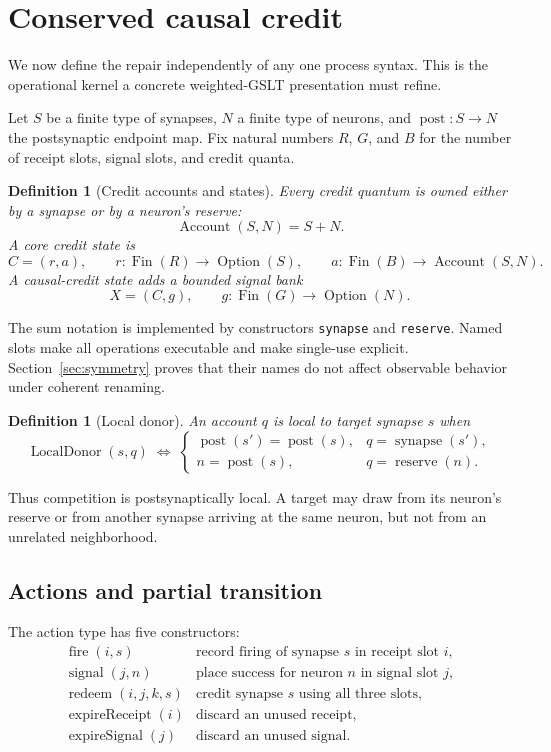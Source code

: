 \documentclass[11pt]{article}
\newtheorem{definition}[theorem]{Definition}
\newcommand{\GSLT}{\textup{GSLT}}
\newcommand{\Fin}{\operatorname{Fin}}
\newcommand{\Option}{\operatorname{Option}}
\newcommand{\post}{\operatorname{post}}
\newcommand{\reserve}{\operatorname{reserve}}
\newcommand{\synapse}{\operatorname{synapse}}
\newcommand{\Account}{\operatorname{Account}}
\newcommand{\code}[1]{\texttt{#1}}
\begin{document}
\section{Conserved causal credit}
\label{sec:semantics}

We now define the repair independently of any one process syntax.  This is the
operational kernel a concrete weighted-\GSLT{} presentation must refine.

Let $S$ be a finite type of synapses, $N$ a finite type of neurons, and
$\post:S\to N$ the postsynaptic endpoint map.  Fix natural numbers $R$, $G$,
and $B$ for the number of receipt slots, signal slots, and credit quanta.

\begin{definition}[Credit accounts and states]
Every credit quantum is owned either by a synapse or by a neuron's reserve:
\[
  \Account(S,N)=S+N.
\]
A core credit state is
\[
  C=(r,a),\qquad
  r:\Fin(R)\to\Option(S),\qquad
  a:\Fin(B)\to\Account(S,N).
\]
A causal-credit state adds a bounded signal bank
\[
  X=(C,g),\qquad g:\Fin(G)\to\Option(N).
\]
\end{definition}

The sum notation is implemented by constructors \code{synapse} and
\code{reserve}.  Named slots make all operations executable and make
single-use explicit.  Section~\ref{sec:symmetry} proves that their names do not
affect observable behavior under coherent renaming.

\begin{definition}[Local donor]
An account $q$ is local to target synapse $s$ when
\[
\operatorname{LocalDonor}(s,q)\;\Longleftrightarrow\;
\begin{cases}
  \post(s')=\post(s), & q=\synapse(s'),\\
  n=\post(s), & q=\reserve(n).
\end{cases}
\]
\end{definition}

Thus competition is postsynaptically local.  A target may draw from its
neuron's reserve or from another synapse arriving at the same neuron, but not
from an unrelated neighborhood.

\subsection{Actions and partial transition}

The action type has five constructors:
\[
\begin{array}{ll}
\operatorname{fire}(i,s) & \text{record firing of synapse $s$ in receipt slot $i$},\\
\operatorname{signal}(j,n) & \text{place success for neuron $n$ in signal slot $j$},\\
\operatorname{redeem}(i,j,k,s) & \text{credit synapse $s$ using all three slots},\\
\operatorname{expireReceipt}(i) & \text{discard an unused receipt},\\
\operatorname{expireSignal}(j) & \text{discard an unused signal}.
\end{array}
\]
\end{document}
